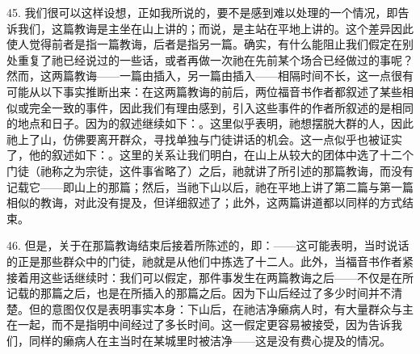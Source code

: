45. 我们很可以这样设想，正如我所说的，要不是感到难以处理的一个情况，即告诉我们，这篇教诲是主坐在山上讲的；而说，是主站在平地上讲的。这个差异因此使人觉得前者是指一篇教诲，后者是指另一篇。确实，有什么能阻止我们假定在别处重复了祂已经说过的一些话，或者再做一次祂在先前某个场合已经做过的事呢？然而，这两篇教诲——一篇由插入，另一篇由插入——相隔时间不长，这一点很有可能从以下事实推断出来：在这两篇教诲的前后，两位福音书作者都叙述了某些相似或完全一致的事件，因此我们有理由感到，引入这些事件的作者所叙述的是相同的地点和日子。因为的叙述继续如下：。这里似乎表明，祂想摆脱大群的人，因此祂上了山，仿佛要离开群众，寻找单独与门徒讲话的机会。这一点似乎也被证实了，他的叙述如下：。这里的关系让我们明白，在山上从较大的团体中选了十二个门徒（祂称之为宗徒，这件事省略了）之后，祂就讲了所引述的那篇教诲，而没有记载它——即山上的那篇；然后，当祂下山以后，祂在平地上讲了第二篇与第一篇相似的教诲，对此没有提及，但详细叙述了；此外，这两篇讲道都以同样的方式结束。\par

46. 但是，关于在那篇教诲结束后接着所陈述的，即：——这可能表明，当时说话的正是那些群众中的门徒，祂就是从他们中拣选了十二人。此外，当福音书作者紧接着用这些话继续时：我们可以假定，那件事发生在两篇教诲之后——不仅是在所记载的那篇之后，也是在所插入的那篇之后。因为下山后经过了多少时间并不清楚。但的意图仅仅是表明事实本身：下山后，在祂洁净癞病人时，有大量群众与主在一起，而不是指明中间经过了多长时间。这一假定更容易被接受，因为告诉我们，同样的癞病人在主当时在某城里时被洁净——这是没有费心提及的情况。\par

